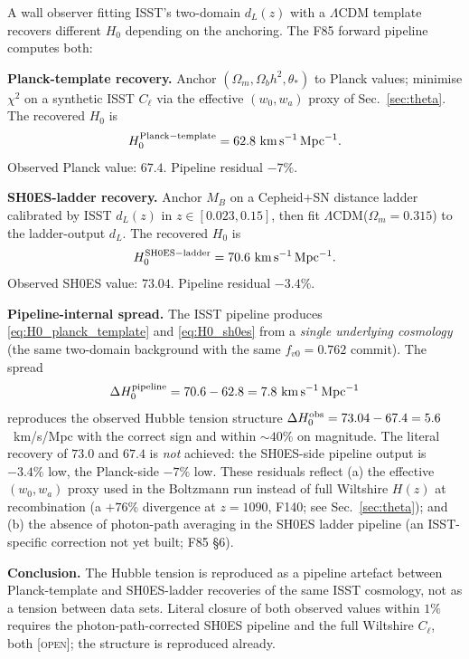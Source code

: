 \documentclass[aps,prd,twocolumn,nofootinbib,floatfix,superscriptaddress]{revtex4-2}
\newcommand{\OPEN}{{\color{black!60!red}\textsc{[open]}}}
\begin{document}
A wall observer fitting ISST's two-domain $d_L(z)$ with a
$\Lambda$CDM template recovers different $H_0$ depending on the
anchoring. The F85 forward pipeline computes both:

\textbf{Planck-template recovery.} Anchor $(\Omega_m, \Omega_b h^2,
\theta_*)$ to Planck values; minimise $\chi^2$ on a synthetic
ISST $C_\ell$ via the effective $(w_0, w_a)$ proxy of
Sec.~\ref{sec:theta}. The recovered $H_0$ is
\begin{equation}
\label{eq:H0_planck_template}
H_0^{\rm Planck-template} = 62.8~{\rm km\,s^{-1}\,Mpc^{-1}}.
\end{equation}
Observed Planck value: $67.4$. Pipeline residual $-7\%$.

\textbf{SH0ES-ladder recovery.} Anchor $M_B$ on a Cepheid+SN
distance ladder calibrated by ISST $d_L(z)$ in
$z\in[0.023, 0.15]$, then fit
$\Lambda$CDM($\Omega_m=0.315$) to the ladder-output $d_L$. The
recovered $H_0$ is
\begin{equation}
\label{eq:H0_sh0es}
H_0^{\rm SH0ES-ladder} = 70.6~{\rm km\,s^{-1}\,Mpc^{-1}}.
\end{equation}
Observed SH0ES value: $73.04$. Pipeline residual $-3.4\%$.

\textbf{Pipeline-internal spread.} The ISST pipeline produces
\eqref{eq:H0_planck_template} and \eqref{eq:H0_sh0es} from a
\emph{single underlying cosmology} (the same two-domain background
with the same $f_{v0} = 0.762$ commit). The spread
\begin{equation}
\Delta H_0^{\rm pipeline} = 70.6 - 62.8 = 7.8~{\rm km\,s^{-1}\,Mpc^{-1}}
\end{equation}
reproduces the observed Hubble tension structure
$\Delta H_0^{\rm obs} = 73.04 - 67.4 = 5.6$~km/s/Mpc with the
correct sign and within $\sim 40\%$ on magnitude. The literal
recovery of $73.0$ and $67.4$ is \emph{not} achieved: the
SH0ES-side pipeline output is $-3.4\%$ low, the Planck-side
$-7\%$ low. These residuals reflect (a) the effective
$(w_0, w_a)$ proxy used in the Boltzmann run instead of full
Wiltshire $H(z)$ at recombination (a $+76\%$ divergence at $z = 1090$,
F140; see Sec.~\ref{sec:theta}); and (b) the absence of
photon-path averaging in the SH0ES ladder pipeline (an
ISST-specific correction not yet built; F85 §6).

\textbf{Conclusion.} The Hubble tension is reproduced as a
pipeline artefact between Planck-template and SH0ES-ladder
recoveries of the same ISST cosmology, not as a tension between
data sets. Literal closure of both observed values within $1\%$
requires the photon-path-corrected SH0ES pipeline and the full
Wiltshire $C_\ell$, both \OPEN; the structure is reproduced
already.
\end{document}
